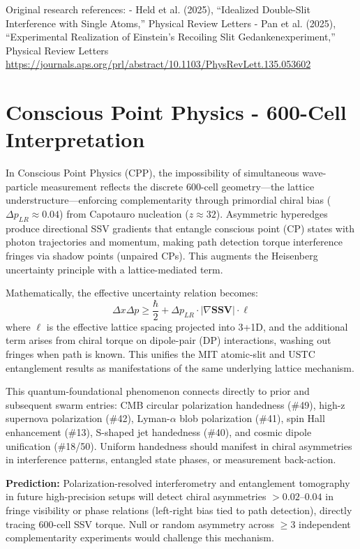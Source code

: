 \documentclass[11pt]{article}
\begin{document}
Original research references:  
- Held et al. (2025), ``Idealized Double-Slit Interference with Single Atoms,'' Physical Review Letters  
- Pan et al. (2025), ``Experimental Realization of Einstein's Recoiling Slit Gedankenexperiment,'' Physical Review Letters  
\url{https://journals.aps.org/prl/abstract/10.1103/PhysRevLett.135.053602}

\section{Conscious Point Physics - 600-Cell Interpretation}
In Conscious Point Physics (CPP), the impossibility of simultaneous wave-particle measurement reflects the discrete 600-cell geometry—the lattice understructure—enforcing complementarity through primordial chiral bias ($\Delta p_{LR} \approx 0.04$) from Capotauro nucleation ($z \approx 32$). Asymmetric hyperedges produce directional SSV gradients that entangle conscious point (CP) states with photon trajectories and momentum, making path detection torque interference fringes via shadow points (unpaired CPs). This augments the Heisenberg uncertainty principle with a lattice-mediated term.

Mathematically, the effective uncertainty relation becomes:  
\[
\Delta x \Delta p \geq \frac{\hbar}{2} + \Delta p_{LR} \cdot |\nabla \mathbf{SSV}| \cdot \ell
\]  
where $\ell$ is the effective lattice spacing projected into 3+1D, and the additional term arises from chiral torque on dipole-pair (DP) interactions, washing out fringes when path is known. This unifies the MIT atomic-slit and USTC entanglement results as manifestations of the same underlying lattice mechanism.

This quantum-foundational phenomenon connects directly to prior and subsequent swarm entries: CMB circular polarization handedness (\#49), high-z supernova polarization (\#42), Lyman-$\alpha$ blob polarization (\#41), spin Hall enhancement (\#13), S-shaped jet handedness (\#40), and cosmic dipole unification (\#18/50). Uniform handedness should manifest in chiral asymmetries in interference patterns, entangled state phases, or measurement back-action.

\textbf{Prediction:} Polarization-resolved interferometry and entanglement tomography in future high-precision setups will detect chiral asymmetries $> 0.02$--$0.04$ in fringe visibility or phase relations (left-right bias tied to path detection), directly tracing 600-cell SSV torque. Null or random asymmetry across $\geq 3$ independent complementarity experiments would challenge this mechanism.
\end{document}
